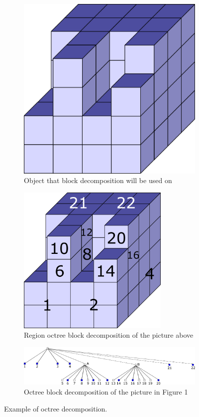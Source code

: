 \begin{figure}
\centering
\begin{subfigure}[t]{.48\textwidth}
 \centering
 \includegraphics[width=.8\linewidth]{mat3d_todo}
  \caption{Object that block decomposition will be used on}
  \label{fig:sub1}
\end{subfigure}%
\hfill%
\begin{subfigure}[t]{.48\textwidth}
 \centering
 \includegraphics[width=0.8\textwidth]{mat3d_todo_other2}
 \caption{Region octree block decomposition of the picture above}
\end{subfigure}

\vspace{10px}
\begin{subfigure}{\textwidth}
\centering
\includegraphics[width=\textwidth]{mat3d_strom}
\caption{Octree block decomposition of the picture in Figure 1}
\end{subfigure}
\caption{Example of octree decomposition.}
\label{octree2}
\end{figure}

